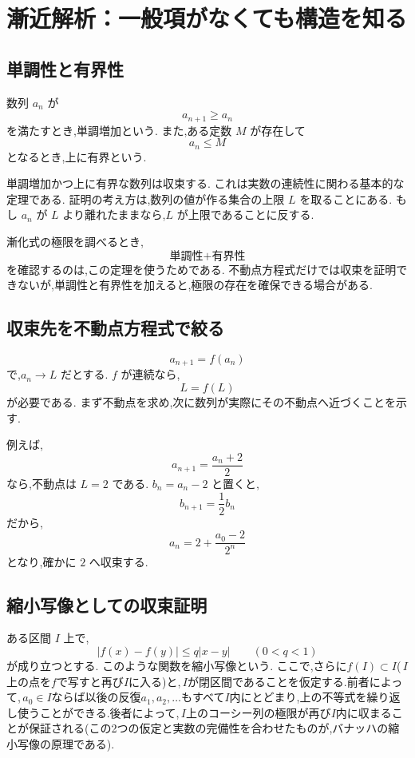 
\section{漸近解析：一般項がなくても構造を知る}

\subsection{単調性と有界性}

数列 $a_n$ が
\[
  a_{n+1}\geq a_n
\]
を満たすとき,単調増加という.
また,ある定数 $M$ が存在して
\[
  a_n\leq M
\]
となるとき,上に有界という.

単調増加かつ上に有界な数列は収束する.
これは実数の連続性に関わる基本的な定理である.
証明の考え方は,数列の値が作る集合の上限 $L$ を取ることにある.
もし $a_n$ が $L$ より離れたままなら,$L$ が上限であることに反する.

漸化式の極限を調べるとき,
\[
  \text{単調性}+\text{有界性}
\]
を確認するのは,この定理を使うためである.
不動点方程式だけでは収束を証明できないが,単調性と有界性を加えると,極限の存在を確保できる場合がある.

\subsection{収束先を不動点方程式で絞る}

\[
  a_{n+1}=f(a_n)
\]
で,$a_n\to L$ だとする.
$f$ が連続なら,
\[
  L=f(L)
\]
が必要である.
まず不動点を求め,次に数列が実際にその不動点へ近づくことを示す.

例えば,
\[
  a_{n+1}=\frac{a_n+2}{2}
\]
なら,不動点は $L=2$ である.
$b_n=a_n-2$ と置くと,
\[
  b_{n+1}=\frac12b_n
\]
だから,
\[
  a_n=2+\frac{a_0-2}{2^n}
\]
となり,確かに $2$ へ収束する.

\subsection{縮小写像としての収束証明}

ある区間 $I$ 上で,
\[
  |f(x)-f(y)|\leq q|x-y|
  \qquad(0<q<1)
\]
が成り立つとする.
このような関数を縮小写像という.
ここで,さらに$f(I)\subset I$(\,$I$上の点を$f$で写すと再び$I$に入る)と,\,$I$が閉区間であることを仮定する.前者によって,\,$a_0\in I$ならば以後の反復$a_1,a_2,\ldots$もすべて$I$内にとどまり,上の不等式を繰り返し使うことができる.後者によって,\,$I$上のコーシー列の極限が再び$I$内に収まることが保証される(この2つの仮定と実数の完備性を合わせたものが,バナッハの縮小写像の原理である).

